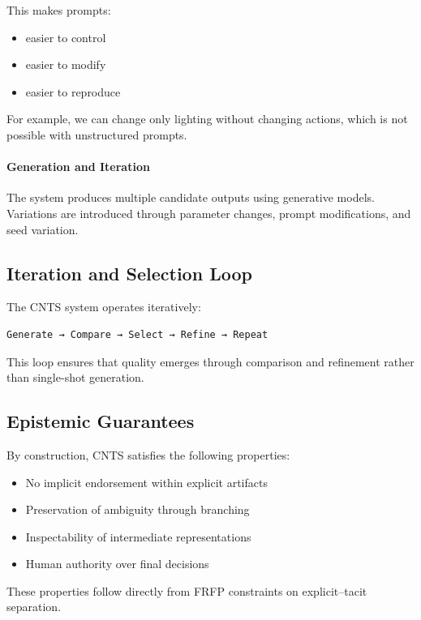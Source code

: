 \documentclass[preprints,article,submit,pdftex,moreauthors,accept]{Definitions/mdpi}
\begin{document}
This makes prompts:
\begin{itemize}
    \item easier to control
    \item easier to modify
    \item easier to reproduce
\end{itemize}

For example, we can change only lighting without changing actions, which is not possible with unstructured prompts.
\paragraph{Generation and Iteration}
The system produces multiple candidate outputs using generative models. Variations are introduced through parameter changes, prompt modifications, and seed variation.

\subsection{Iteration and Selection Loop}

The CNTS system operates iteratively:

\begin{center}
\begin{verbatim}
Generate → Compare → Select → Refine → Repeat
\end{verbatim}
\end{center}

This loop ensures that quality emerges through comparison and refinement rather than single-shot generation.

\subsection{Epistemic Guarantees}

By construction, CNTS satisfies the following properties:

\begin{itemize}
    \item No implicit endorsement within explicit artifacts
    \item Preservation of ambiguity through branching
    \item Inspectability of intermediate representations
    \item Human authority over final decisions
\end{itemize}

These properties follow directly from FRFP constraints on explicit–tacit separation.
\end{document}
